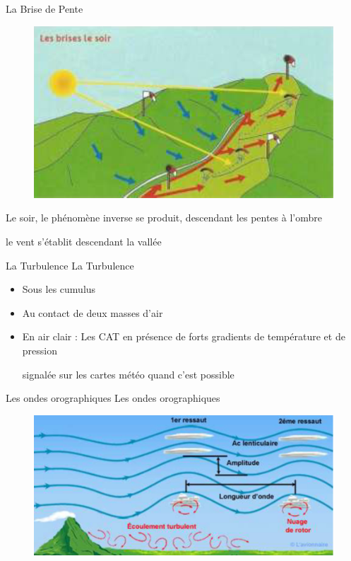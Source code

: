 \documentclass{beamer}
\begin{document}
\begin{frame}{La Brise de Pente}
  
  \begin{figure}
    \centering
    \includegraphics[scale=1]{images/brise-montagne-soir.png}
  \end{figure}

  \pause
  Le soir, le phénomène inverse se produit, descendant les pentes à l'ombre

  \pause le vent s'établit descendant la vallée

\end{frame}

\begin{frame}{La Turbulence}
  La Turbulence
  \pause
  
  \begin{itemize}
    \item Sous les cumulus \pause
    \item Au contact de deux masses d'air \pause
    \item En air clair : Les CAT en présence de forts gradients de température et de pression \pause
      
      signalée sur les cartes météo quand c'est possible
  \end{itemize}
\end{frame}

\begin{frame}{Les ondes orographiques}
    Les ondes orographiques
  \pause

  \begin{figure}
    \centering
    \includegraphics[scale=1]{images/orographique.png}
  \end{figure}
\end{frame}
\end{document}

